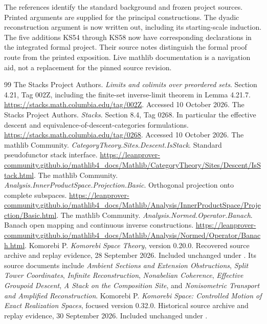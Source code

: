 \clearpage
{}\label{app:references}
The references identify the standard background and frozen project sources. Printed arguments are supplied for the principal constructions. The dyadic reconstruction argument is now written out, including its starting-scale induction. The five additions KS54 through KS58 now have corresponding declarations in the integrated formal project. Their source notes distinguish the formal proof route from the printed exposition. Live mathlib documentation is a navigation aid, not a replacement for the pinned source revision.

\begin{thebibliography}{99}
 The Stacks Project Authors. \emph{Limits and colimits over preordered sets}. Section 4.21, Tag 002Z, including the finite-set inverse-limit theorem in Lemma 4.21.7. \url{https://stacks.math.columbia.edu/tag/002Z}. Accessed 10 October 2026.
 The Stacks Project Authors. \emph{Stacks}. Section 8.4, Tag 0268. In particular the effective descent and equivalence-of-descent-categories formulations. \url{https://stacks.math.columbia.edu/tag/0268}. Accessed 10 October 2026.
 The mathlib Community. \emph{CategoryTheory.Sites.Descent.IsStack}. Standard pseudofunctor stack interface. \url{https://leanprover-community.github.io/mathlib4_docs/Mathlib/CategoryTheory/Sites/Descent/IsStack.html}.
 The mathlib Community. \emph{Analysis.InnerProductSpace.Projection.Basic}. Orthogonal projection onto complete subspaces. \url{https://leanprover-community.github.io/mathlib4_docs/Mathlib/Analysis/InnerProductSpace/Projection/Basic.html}.
 The mathlib Community. \emph{Analysis.Normed.Operator.Banach}. Banach open mapping and continuous inverse constructions. \url{https://leanprover-community.github.io/mathlib4_docs/Mathlib/Analysis/Normed/Operator/Banach.html}.
 Komorebi P. \emph{Komorebi Space Theory}, version 0.20.0. Recovered source archive and replay evidence, 28 September 2026. Included unchanged under . Its source documents include \emph{Ambient Sections and Extension Obstructions}, \emph{Split Tower Coordinates}, \emph{Infinite Reconstruction}, \emph{Nonabelian Coherence}, \emph{Effective Groupoid Descent}, \emph{A Stack on the Composition Site}, and \emph{Nonisometric Transport and Amplified Reconstruction}.
 Komorebi P. \emph{Komorebi Space: Controlled Motion of Exact Realization Spaces}, focused version 0.32.0. Historical source archive and replay evidence, 30 September 2026. Included unchanged under .

\end{thebibliography}
